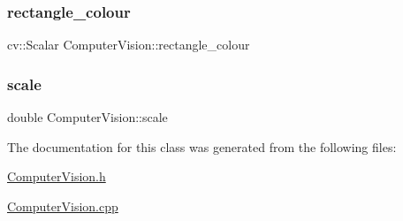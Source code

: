 \mbox{\label{classComputerVision_af85281318e654de22e153b4e77163f25}} 
\subsubsection{\texorpdfstring{rectangle\+\_\+colour}{rectangle\_colour}}
{\footnotesize\ttfamily cv\+::\+Scalar Computer\+Vision\+::rectangle\+\_\+colour\hspace{0.3cm}{\ttfamily [private]}}

\mbox{\label{classComputerVision_abf1765f5ca546b58b924b3c54f9703df}} 
\subsubsection{\texorpdfstring{scale}{scale}}
{\footnotesize\ttfamily double Computer\+Vision\+::scale\hspace{0.3cm}{\ttfamily [private]}}



The documentation for this class was generated from the following files\+:\begin{DoxyCompactItemize}
\item 
\hyperlink{ComputerVision_8h}{Computer\+Vision.\+h}\item 
\hyperlink{ComputerVision_8cpp}{Computer\+Vision.\+cpp}\end{DoxyCompactItemize}
